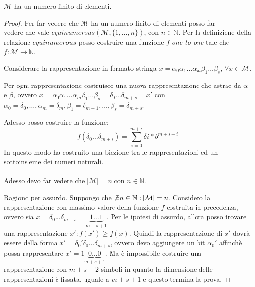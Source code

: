 \begin{exercise}[1.6]
$\mathcal{M}$ ha un numero finito di elementi.
\end{exercise}
\begin{proof}
Per far vedere che $\mathcal{M}$ ha un numero finito di elementi posso far \\
vedere che vale
$equinumerous(\mathcal{M}, \lbrace 1, \ldots, n\rbrace)$, con $n \in \mathbb{N}$.
Per la definizione della relazione $equinumerous$ posso costruire una funzione $f$
\emph{one-to-one} tale che $f: \mathcal{M} \rightarrow \mathbb{N}$.

Considerare la rappresentazione in formato stringa 
$x = \alpha_{0}\alpha_{1}\ldots\alpha_{m}\beta_{1}\ldots\beta_{s}$, $\forall x \in \mathcal{M}$.

Per ogni rappresentazione costruisco una nuova rappresentazione che astrae da $\alpha$ e $\beta$, 
ovvero $x = \alpha_{0}\alpha_{1}\ldots\alpha_{m}\beta_{1}\ldots\beta_{s} = \delta_{0} \ldots 
\delta_{m + s} = x'$
con $\alpha_{0} = \delta_{0}, \ldots, \alpha_{m} = \delta_{m}, \beta_{1} = \delta_{m + 1}, \ldots, 
\beta_{s} = \delta_{m + s}$.

Adesso posso costruire la funzione:
\begin{displaymath}
f(\delta_{0} \ldots \delta_{m + s}) = \sum_{i = 0}^{m + s}{\delta{i} * b^{m + s - i}}
\end{displaymath}
In questo modo ho costruito una biezione tra le rappresentazioni ed un sottoinsieme 
dei numeri naturali. \\\\
Adesso devo far vedere che $|\mathcal{M}| = n$ con $n \in \mathbb{N}$.

Ragiono per assurdo. Suppongo che $\not \exists n \in \mathbb{N}: |\mathcal{M}| = n$.
Considero la rappresentazione con massimo valore della funzione $f$ costruita in precedenza,
ovvero sia $x = \delta_{0} \ldots \delta_{m + s} = \underbrace{1 \ldots 1}_{m+s+1}$.
Per le ipotesi di assurdo, allora posso trovare una rappresentazione $x':f(x') \geq f(x)$.
Quindi la rappresentazione di $x'$ dovr\`a essere della forma $x' = \delta_{0}' \delta_{0} 
\ldots \delta_{m + s}$,
ovvero devo aggiungere un bit $\alpha_{0}'$ affinch\`e possa rappresentare 
$x' = 1 \underbrace{0 \ldots 0}_{m+s+1}$. Ma \`e impossibile costruire una rappresentazione
con $m+s+2$ simboli in quanto la dimensione delle rappresentazioni \`e fissata, uguale a $m+s+1$ 
e questo termina la prova.

\end{proof}

